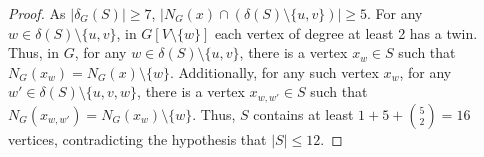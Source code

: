 \documentclass[a4paper,UKenglish,cleveref,autoref,thm-restate]{arxiv}
\newcommand{\ls}{\leqslant}
\newcommand{\gs}{\geqslant}
\newcommand{\sm}{\setminus}
\begin{document}
\begin{proof}
    As $|\delta_G(S)| \gs 7$, $|N_G(x) \cap (\delta(S) \sm \{u,v\})| \gs 5$. For any $w\in \delta(S) \sm \{u,v\}$, in $G[V \sm \{w\}]$ each vertex of degree at least 2 has a twin. Thus, in $G$, for any $w\in \delta(S) \sm \{u,v\}$, there is a vertex $x_w \in S$ such that $N_G(x_w) = N_G(x) \sm \{w\}$. Additionally, for any such vertex $x_w$, for any $w'\in \delta(S) \sm \{u,v,w\}$, there is a vertex $x_{w,w'} \in S$ such that $N_G(x_{w,w'}) = N_G(x_w) \sm \{w\}$. Thus, $S$ contains at least $1+5+\binom{5}{2} = 16$ vertices, contradicting the hypothesis that $|S|\ls 12$.
\end{proof}
\end{document}
